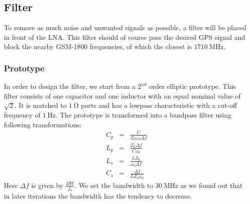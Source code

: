\documentclass[a4paper]{article}        %
\begin{document}
		
	\subsection{Filter}
  To remove as much noise and unwanted signals as possible, a filter will be placed in front of the LNA. This filter should of course pass the desired GPS signal and block the nearby GSM-1800 frequencies, of which the closest is $\SI{1710}{\mega\hertz}$.
  \subsubsection{Prototype}
  In order to design the filter, we start from a $2^{nd}$ order elliptic prototype. This filter consists of one capacitor and one inductor with an equal nominal value of $\sqrt{2}$.  It is matched to $\SI{1}{\ohm}$ ports and has a lowpass characteristic with a cut-off frequency of $\SI{1}{\hertz}$.
  The prototype is transformed into a bandpass filter using following transformations\cite{coupled_lines}:
  \begin{eqnarray*}
    C_p &=& \frac{C}{Z_0 \omega_0 \Delta f}\\
    L_p &=& \frac{Z_0 \Delta f}{C \omega_0}\\
    L_s &=& \frac{L Z_0}{\omega_0 \Delta f}\\
    C_s &=& \frac{\Delta f}{L Z_0 \omega_0}
  \end{eqnarray*}
  Here $\Delta f$ is given by $\frac{BW}{f_0}$. We set the bandwidth to $\SI{30}{\mega\hertz}$ as we found out that in later iterations the bandwidth has the tendency to decrease.
\end{document}
